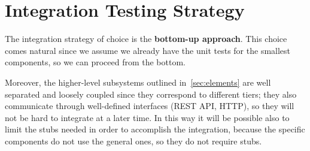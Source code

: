 \section{Integration Testing Strategy}
\label{sec:integration-testing-strategy}

The integration strategy of choice is the \textbf{bottom-up approach}.
This choice comes natural since we assume we already have the unit tests for the smallest components, so we can proceed from the bottom.

Moreover, the higher-level subsystems outlined in~\autoref{sec:elements} are well separated and loosely coupled since they correspond to different tiers;
they also communicate through well-defined interfaces (REST API, HTTP), so they will not be hard to integrate at a later time.
In this way it will be possible also to limit the stubs needed in order to accomplish the integration, because the specific components do not use the general ones, so they do not require stubs.
